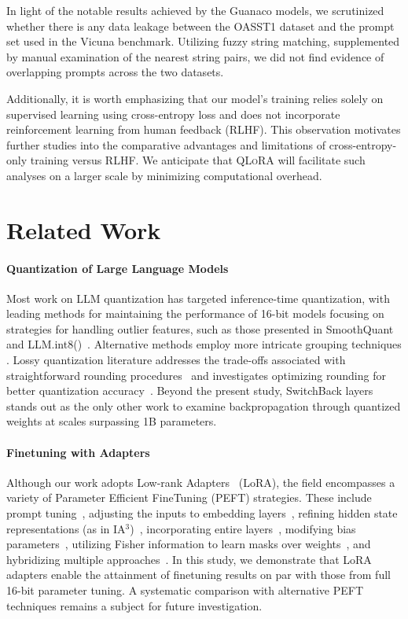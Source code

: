 In light of the notable results achieved by the {Guanaco} models, we scrutinized whether there is any data leakage between the OASST1 dataset and the prompt set used in the Vicuna benchmark. Utilizing fuzzy string matching, supplemented by manual examination of the nearest string pairs, we did not find evidence of overlapping prompts across the two datasets.

Additionally, it is worth emphasizing that our model’s training relies solely on supervised learning using cross-entropy loss and does not incorporate reinforcement learning from human feedback (RLHF). This observation motivates further studies into the comparative advantages and limitations of cross-entropy-only training versus RLHF. We anticipate that \textsc{QLoRA} will facilitate such analyses on a larger scale by minimizing computational overhead.

\section{Related Work}

\paragraph{Quantization of Large Language Models} Most work on LLM quantization has targeted inference-time quantization, with leading methods for maintaining the performance of 16-bit models focusing on strategies for handling outlier features, such as those presented in SmoothQuant~\citep{xiao2022smoothquant} and LLM.int8()~\citep{dettmers2022llm}. Alternative methods employ more intricate grouping techniques \citep{park2022nuqmm, yao2022zeroquant}. Lossy quantization literature addresses the trade-offs associated with straightforward rounding procedures~\citep{dettmers2022case,zeng2022glm,pope2022efficiently} and investigates optimizing rounding for better quantization accuracy~\citep{frantar2022gptq}. Beyond the present study, SwitchBack layers~\citep{wortsman2023stable} stands out as the only other work to examine backpropagation through quantized weights at scales surpassing 1B parameters.

\paragraph{Finetuning with Adapters} Although our work adopts Low-rank Adapters~\citep{hu2021lora} (LoRA), the field encompasses a variety of Parameter Efficient FineTuning (PEFT) strategies. These include prompt tuning~\citep{qin2021learning,lester2021power,li2021prefix}, adjusting the inputs to embedding layers~\citep{an2022input}, refining hidden state representations (as in IA$^3$)~\citep{liu2022few}, incorporating entire layers~\citep{houlsby2019parameter}, modifying bias parameters~\citep{zaken2021bitfit}, utilizing Fisher information to learn masks over weights~\citep{sung2021training}, and hybridizing multiple approaches~\citep{henderson2021compacter}. In this study, we demonstrate that LoRA adapters enable the attainment of finetuning results on par with those from full 16-bit parameter tuning. A systematic comparison with alternative PEFT techniques remains a subject for future investigation.

